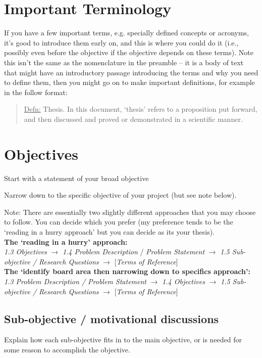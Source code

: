 \section{Important Terminology}

If you have a few important terms, e.g. specially defined concepts or acronyms, it’s good to introduce them early on, and this is where you could do it (i.e., possibly even before the objective if the objective depends on these terms). Note this isn’t the same as the nomenclature in the preamble – it is a body of text that might have an introductory passage introducing the terms and why you need to define them, then you might go on to make important definitions, for example in the follow format:

\begin{quote}
	\underline{Defn:} Thesis. In this document, ‘thesis’ refers to a proposition put forward, and then discussed and proved or demonstrated in a scientific manner.	
\end{quote}

\section{Objectives}

Start with a statement of your broad objective

Narrow down to the specific objective of your project  (but see note below).

\parbox{\textwidth}{
	Note: There are essentially two slightly different approaches that you may choose to follow. You can decide which you prefer (my preference tends to be the `reading in a hurry approach' but you can decide as its your thesis).\\
	\textbf{The `reading in a hurry' approach:} \\
	\emph{1.3  Objectives} $\rightarrow$ \emph{1.4 Problem Description}  /  \emph{Problem Statement} $\rightarrow$ \emph{1.5 Sub-objective / Research Questions} $\rightarrow$ [\emph{Terms of Reference}] \\
	\textbf{The `identify board area then narrowing down to specifics approach':} \\
	\emph{1.3 Problem Description / Problem Statement} $\rightarrow$ \emph{1.4 Objectives} $\rightarrow$ \emph{1.5 Sub-objective / Research Questions} $\rightarrow$  [\emph{Terms of Reference}]
}

\subsection{Sub-objective / motivational discussions}
Explain how each sub-objective fits in to the main objective, or is needed for some reason to accomplish the objective.

